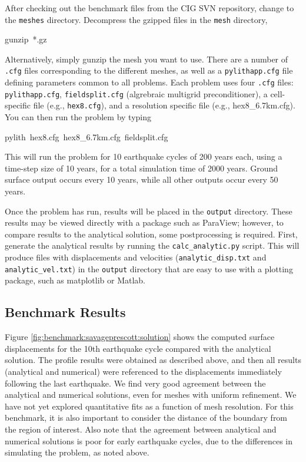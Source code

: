 After checking out the benchmark files from the CIG SVN repository,
change to the \texttt{meshes} directory. Decompress the gzipped files
in the \texttt{mesh} directory,
\begin{lyxcode}
gunzip~{*}.gz
\end{lyxcode}
Alternatively, simply gunzip the mesh you want to use. There are a
number of \texttt{.cfg} files corresponding to the different meshes,
as well as a \texttt{pylithapp.cfg} file defining parameters common
to all problems. Each problem uses four \texttt{.cfg} files: \texttt{pylithapp.cfg},
\texttt{fieldsplit.cfg} (algrebraic multigrid preconditioner), a cell-specific
file (e.g., \texttt{hex8.cfg}), and a resolution specific file (e.g.,
hex8\_6.7km.cfg). You can then run the problem by typing
\begin{lyxcode}
pylith~hex8.cfg~hex8\_6.7km.cfg~fieldsplit.cfg
\end{lyxcode}
This will run the problem for 10 earthquake cycles of 200 years each,
using a time-step size of 10 years, for a total simulation time of
2000 years. Ground surface output occurs every 10 years, while all
other outputs occur every 50 years.

Once the problem has run, results will be placed in the \texttt{output}
directory. These results may be viewed directly with a package such
as ParaView; however, to compare results to the analytical solution,
some postprocessing is required. First, generate the analytical results
by running the \texttt{calc\_analytic.py} script. This will produce
files with displacements and velocities (\texttt{analytic\_disp.txt}
and \texttt{analytic\_vel.txt}) in the \texttt{output} directory that
are easy to use with a plotting package, such as matplotlib or Matlab.


\subsection{Benchmark Results}

Figure \ref{fig:benchmark:savageprescott:solution} shows the computed
surface displacements for the 10th earthquake cycle compared with
the analytical solution. The profile results were obtained as described
above, and then all results (analytical and numerical) were referenced
to the displacements immediately following the last earthquake. We
find very good agreement between the analytical and numerical solutions,
even for meshes with uniform refinement. We have not yet explored
quantitative fits as a function of mesh resolution. For this benchmark,
it is also important to consider the distance of the boundary from
the region of interest. Also note that the agreement between analytical
and numerical solutions is poor for early earthquake cycles, due to
the differences in simulating the problem, as noted above.

